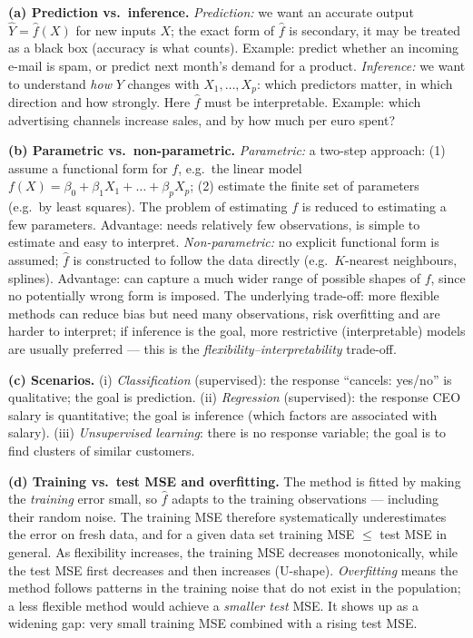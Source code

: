 \documentclass[11pt,a4paper]{article}
\begin{document}
\ifdefined\withsolutions
\begin{solutionbox}
\textbf{(a) Prediction vs.\ inference.}
\emph{Prediction:} we want an accurate output $\hat{Y}=\hat{f}(X)$ for new inputs $X$; the exact
form of $\hat{f}$ is secondary, it may be treated as a black box (accuracy is what counts).
Example: predict whether an incoming e-mail is spam, or predict next month's demand for a product.
\emph{Inference:} we want to understand \emph{how} $Y$ changes with $X_1,\dots,X_p$: which
predictors matter, in which direction and how strongly. Here $\hat{f}$ must be interpretable.
Example: which advertising channels increase sales, and by how much per euro spent?

\medskip
\textbf{(b) Parametric vs.\ non-parametric.}
\emph{Parametric:} a two-step approach: (1) assume a functional form for $f$, e.g.\ the linear
model $f(X)=\beta_0+\beta_1X_1+\dots+\beta_pX_p$; (2) estimate the finite set of parameters
(e.g.\ by least squares). The problem of estimating $f$ is reduced to estimating a few parameters.
Advantage: needs relatively few observations, is simple to estimate and easy to interpret.
\emph{Non-parametric:} no explicit functional form is assumed; $\hat{f}$ is constructed to follow
the data directly (e.g.\ $K$-nearest neighbours, splines). Advantage: can capture a much wider
range of possible shapes of $f$, since no potentially wrong form is imposed.
The underlying trade-off: more flexible methods can reduce bias but need many observations, risk
overfitting and are harder to interpret; if inference is the goal, more restrictive
(interpretable) models are usually preferred --- this is the \emph{flexibility--interpretability}
trade-off.

\medskip
\textbf{(c) Scenarios.}
(i) \emph{Classification} (supervised): the response ``cancels: yes/no'' is qualitative;
the goal is prediction.
(ii) \emph{Regression} (supervised): the response CEO salary is quantitative;
the goal is inference (which factors are associated with salary).
(iii) \emph{Unsupervised learning}: there is no response variable; the goal is to find
clusters of similar customers.

\medskip
\textbf{(d) Training vs.\ test MSE and overfitting.}
The method is fitted by making the \emph{training} error small, so $\hat{f}$ adapts to the
training observations --- including their random noise. The training MSE therefore
systematically underestimates the error on fresh data, and for a given data set
training MSE $\le$ test MSE in general. As flexibility increases, the training MSE decreases
monotonically, while the test MSE first decreases and then increases (U-shape).
\emph{Overfitting} means the method follows patterns in the training noise that do not exist
in the population; a less flexible method would achieve a \emph{smaller test} MSE. It shows up
as a widening gap: very small training MSE combined with a rising test MSE.
\end{solutionbox}
\fi
\end{document}
